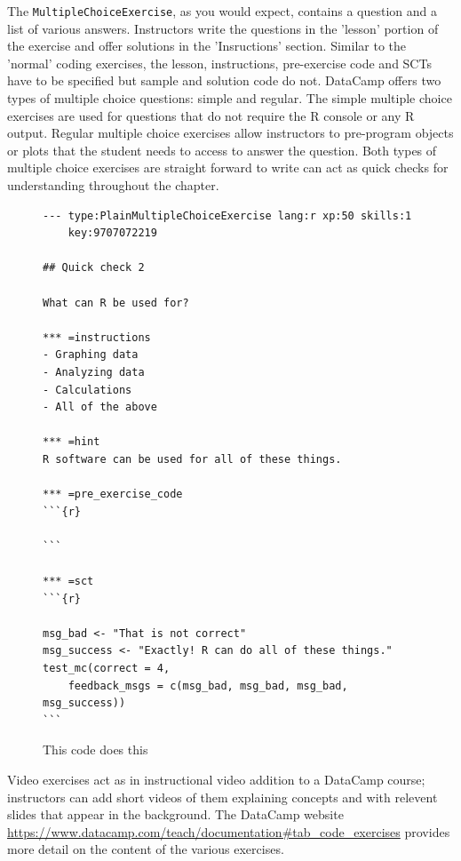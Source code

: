 \documentclass[12pt]{article}
\begin{document}




The \texttt{MultipleChoiceExercise}, as you would expect, contains a question and a list of various answers. Instructors write the questions in the 'lesson'
portion of the exercise and offer solutions in the 'Insructions' section. Similar to the 'normal' coding exercises, the lesson, instructions, pre-exercise 
code and SCTs have to be specified but sample and solution code do not. DataCamp offers two types of multiple choice questions: simple and regular. 
The simple multiple choice exercises are used for questions that do not require the R console or any R output. Regular multiple choice exercises 
allow instructors to pre-program objects or plots that the student needs to access to answer the question. Both types of multiple choice exercises 
are straight forward to write can act as quick checks for understanding throughout the chapter.

\begin{figure}
\caption{This code does this}
\begin{Verbatim}[frame=single]
--- type:PlainMultipleChoiceExercise lang:r xp:50 skills:1
    key:9707072219

## Quick check 2

What can R be used for?

*** =instructions
- Graphing data
- Analyzing data
- Calculations
- All of the above

*** =hint
R software can be used for all of these things.

*** =pre_exercise_code
```{r}

```

*** =sct
```{r}

msg_bad <- "That is not correct"
msg_success <- "Exactly! R can do all of these things."
test_mc(correct = 4, 
    feedback_msgs = c(msg_bad, msg_bad, msg_bad, msg_success))
```
\end{Verbatim}
\end{figure}


Video exercises act as in instructional video addition to a DataCamp course; instructors can add short videos of them explaining concepts and with 
relevent slides that appear in the background. The DataCamp website \url{https://www.datacamp.com/teach/documentation#tab_code_exercises} provides 
more detail on the content of the various exercises. 
\end{document}
